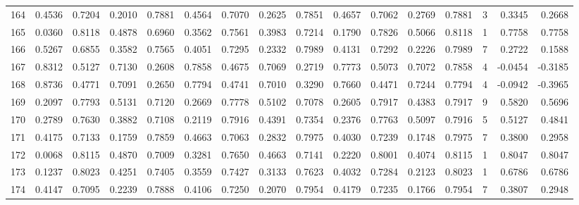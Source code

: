\begin{tabular}{lrrrrrrrrrrrrrrr}
164 &      0.4536 &  0.7204 &  0.2010 &  0.7881 &  0.4564 &  0.7070 &  0.2625 &  0.7851 &  0.4657 &  0.7062 &   0.2769 &     0.7881 &      3 &                    0.3345 &                     0.2668 \\
165 &      0.0360 &  0.8118 &  0.4878 &  0.6960 &  0.3562 &  0.7561 &  0.3983 &  0.7214 &  0.1790 &  0.7826 &   0.5066 &     0.8118 &      1 &                    0.7758 &                     0.7758 \\
166 &      0.5267 &  0.6855 &  0.3582 &  0.7565 &  0.4051 &  0.7295 &  0.2332 &  0.7989 &  0.4131 &  0.7292 &   0.2226 &     0.7989 &      7 &                    0.2722 &                     0.1588 \\
167 &      0.8312 &  0.5127 &  0.7130 &  0.2608 &  0.7858 &  0.4675 &  0.7069 &  0.2719 &  0.7773 &  0.5073 &   0.7072 &     0.7858 &      4 &                   -0.0454 &                    -0.3185 \\
168 &      0.8736 &  0.4771 &  0.7091 &  0.2650 &  0.7794 &  0.4741 &  0.7010 &  0.3290 &  0.7660 &  0.4471 &   0.7244 &     0.7794 &      4 &                   -0.0942 &                    -0.3965 \\
169 &      0.2097 &  0.7793 &  0.5131 &  0.7120 &  0.2669 &  0.7778 &  0.5102 &  0.7078 &  0.2605 &  0.7917 &   0.4383 &     0.7917 &      9 &                    0.5820 &                     0.5696 \\
170 &      0.2789 &  0.7630 &  0.3882 &  0.7108 &  0.2119 &  0.7916 &  0.4391 &  0.7354 &  0.2376 &  0.7763 &   0.5097 &     0.7916 &      5 &                    0.5127 &                     0.4841 \\
171 &      0.4175 &  0.7133 &  0.1759 &  0.7859 &  0.4663 &  0.7063 &  0.2832 &  0.7975 &  0.4030 &  0.7239 &   0.1748 &     0.7975 &      7 &                    0.3800 &                     0.2958 \\
172 &      0.0068 &  0.8115 &  0.4870 &  0.7009 &  0.3281 &  0.7650 &  0.4663 &  0.7141 &  0.2220 &  0.8001 &   0.4074 &     0.8115 &      1 &                    0.8047 &                     0.8047 \\
173 &      0.1237 &  0.8023 &  0.4251 &  0.7405 &  0.3559 &  0.7427 &  0.3133 &  0.7623 &  0.4032 &  0.7284 &   0.2123 &     0.8023 &      1 &                    0.6786 &                     0.6786 \\
174 &      0.4147 &  0.7095 &  0.2239 &  0.7888 &  0.4106 &  0.7250 &  0.2070 &  0.7954 &  0.4179 &  0.7235 &   0.1766 &     0.7954 &      7 &                    0.3807 &                     0.2948 \\

\end{tabular}
